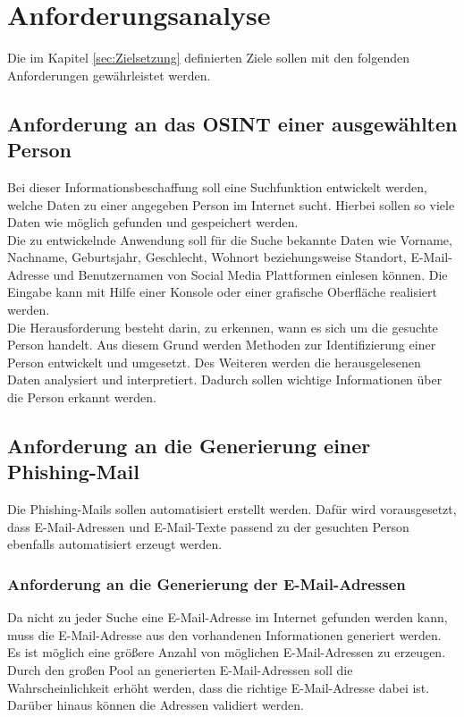 
\chapter{Anforderungsanalyse}  %
\label{cha:Anforderungsanalyse} %
Die im Kapitel \ref{sec:Zielsetzung} definierten Ziele sollen mit den folgenden Anforderungen gewährleistet werden.

\section{Anforderung an das OSINT einer ausgewählten Person}
Bei dieser Informationsbeschaffung soll eine Suchfunktion entwickelt werden, welche Daten zu einer angegeben Person im Internet sucht. Hierbei sollen so viele Daten wie möglich gefunden und gespeichert werden.\\
Die zu entwickelnde Anwendung soll für die Suche bekannte Daten wie Vorname, Nachname, Geburtsjahr, Geschlecht, Wohnort beziehungsweise Standort, E-Mail-Adresse und Benutzernamen von Social Media Plattformen einlesen können. Die Eingabe kann mit Hilfe einer Konsole oder einer grafische Oberfläche realisiert werden.\\
Die Herausforderung besteht darin, zu erkennen, wann es sich um die gesuchte Person handelt. Aus diesem Grund werden Methoden zur Identifizierung einer Person entwickelt und umgesetzt. Des Weiteren werden die herausgelesenen Daten analysiert und interpretiert. Dadurch sollen wichtige Informationen über die Person erkannt werden.

\section{Anforderung an die Generierung einer Phishing-Mail}
Die Phishing-Mails sollen automatisiert erstellt werden. Dafür wird vorausgesetzt, dass E-Mail-Adressen und E-Mail-Texte passend zu der gesuchten Person ebenfalls automatisiert erzeugt werden.
	\subsection{Anforderung an die Generierung der E-Mail-Adressen}
	Da nicht zu jeder Suche eine E-Mail-Adresse im Internet gefunden werden kann, muss die E-Mail-Adresse aus den vorhandenen Informationen generiert werden. Es ist möglich eine größere Anzahl von möglichen E-Mail-Adressen zu erzeugen. Durch den großen Pool an generierten E-Mail-Adressen soll die Wahrscheinlichkeit erhöht werden, dass die richtige E-Mail-Adresse dabei ist. Darüber hinaus können die Adressen validiert werden.
